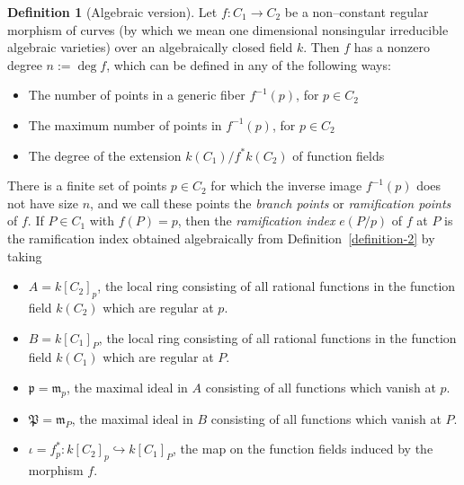 \documentclass[12pt]{article}
\newcommand{\p}{{\mathfrak{p}}}
\newcommand{\m}{{\mathfrak{m}}}
\renewcommand{\P}{{\mathfrak{P}}}
\newcommand{\lra}{\longrightarrow}
\theoremstyle{definition}
\newtheorem{definition}[theorem]{Definition}
\begin{document}
\begin{definition}[Algebraic version]\label{algebraic}
Let $f: C_1 \lra C_2$ be a non--constant regular morphism of curves
(by which we mean one dimensional nonsingular irreducible algebraic
varieties) over an algebraically closed field $k$. Then $f$ has a
nonzero degree $n := \deg f$, which can be defined in any of the
following ways:
\begin{itemize}
\item The number of points in a generic fiber $f^{-1}(p)$, for $p \in
C_2$
\item The maximum number of points in $f^{-1}(p)$, for $p \in C_2$
\item The degree of the extension $k(C_1)/f^* k(C_2)$ of function
fields
\end{itemize}

There is a finite set of points $p \in C_2$ for which the inverse
image $f^{-1}(p)$ does not have size $n$, and we call these points the
{\em branch points} or {\em ramification points} of $f$. If $P \in
C_1$ with $f(P) = p$, then the {\em ramification index} $e(P/p)$ of
$f$ at $P$ is the ramification index obtained algebraically from
Definition~\ref{definition-2} by taking
\begin{itemize}
\item $A = k[C_2]_p$, the local ring consisting of all rational
functions in the function field $k(C_2)$ which are regular at $p$.
\item $B = k[C_1]_P$, the local ring consisting of all rational
functions in the function field $k(C_1)$ which are regular at $P$.
\item $\p = \m_p$, the maximal ideal in $A$ consisting of all
functions which vanish at $p$.
\item $\P = \m_P$, the maximal ideal in $B$ consisting of all
functions which vanish at $P$.
\item $\iota = f^*_p: k[C_2]_p \hookrightarrow k[C_1]_P$, the map on
the function fields induced by the morphism $f$.
\end{itemize}
\end{definition}
\end{document}
